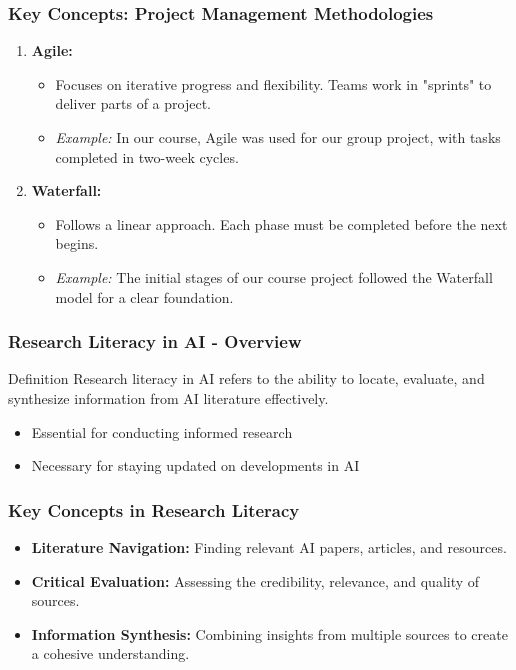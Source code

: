 \documentclass{beamer}
\begin{document}
\begin{frame}[fragile]
    \frametitle{Key Concepts: Project Management Methodologies}
    \begin{enumerate}
        \item \textbf{Agile:}
        \begin{itemize}
            \item Focuses on iterative progress and flexibility. Teams work in "sprints" to deliver parts of a project.
            \item \textit{Example:} In our course, Agile was used for our group project, with tasks completed in two-week cycles.
        \end{itemize}
        
        \item \textbf{Waterfall:}
        \begin{itemize}
            \item Follows a linear approach. Each phase must be completed before the next begins.
            \item \textit{Example:} The initial stages of our course project followed the Waterfall model for a clear foundation.
        \end{itemize}
    \end{enumerate}
\end{frame}

\begin{frame}[fragile]
    \frametitle{Research Literacy in AI - Overview}
    \begin{block}{Definition}
        Research literacy in AI refers to the ability to locate, evaluate, and synthesize information from AI literature effectively.
    \end{block}

    \begin{itemize}
        \item Essential for conducting informed research
        \item Necessary for staying updated on developments in AI
    \end{itemize}
\end{frame}

\begin{frame}[fragile]
    \frametitle{Key Concepts in Research Literacy}
    \begin{itemize}
        \item \textbf{Literature Navigation:} Finding relevant AI papers, articles, and resources.
        \item \textbf{Critical Evaluation:} Assessing the credibility, relevance, and quality of sources.
        \item \textbf{Information Synthesis:} Combining insights from multiple sources to create a cohesive understanding.
    \end{itemize}
\end{frame}
\end{document}
